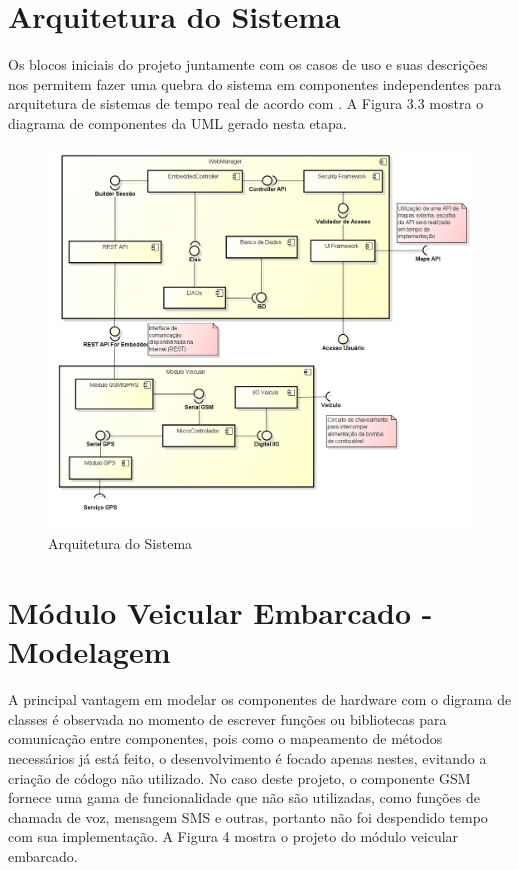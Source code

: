 \newpage

\section{Arquitetura do Sistema}
Os blocos iniciais do projeto juntamente com os casos de uso e suas descrições nos permitem fazer 
uma quebra do sistema em componentes independentes para arquitetura de sistemas de tempo real de 
acordo com \textcite{Mendes:2002}. A Figura 3.3 mostra o diagrama de componentes da UML gerado nesta 
etapa.

\begin{figure}[!htb]
\centering
\includegraphics[width=\textwidth]{figures/4_arquitetural.png}
\caption{Arquitetura do Sistema}
\label{Figura 3}
\end{figure}


\section{Módulo Veicular Embarcado - Modelagem}
A principal vantagem em modelar os componentes de hardware com o digrama de classes é observada
no momento de escrever funções ou bibliotecas para comunicação entre componentes, pois como o 
mapeamento de métodos necessários já está feito, o desenvolvimento é focado apenas nestes,
evitando a criação de códogo não utilizado. No caso deste projeto, o componente GSM fornece 
uma gama de funcionalidade que não são utilizadas, como funções de chamada de voz, mensagem SMS
e outras, portanto não foi despendido tempo com sua implementação. A Figura 4 mostra o projeto
do módulo veicular embarcado.

